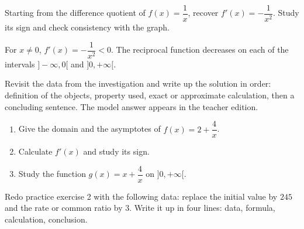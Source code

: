 \begin{activite}
Starting from the difference quotient of $f(x)=\dfrac1x$, recover $f'(x)=-\dfrac1{x^2}$. Study its sign and check consistency with the graph.

\end{activite}

\begin{traceecrite}For $x\neq0$, $f'(x)=-\dfrac1{x^2}<0$. The reciprocal function decreases on each of the intervals $]-\infty,0[$ and $]0,+\infty[$.\end{traceecrite}

\begin{exemple}
Revisit the data from the investigation and write up the solution in order: definition of the objects, property used, exact or approximate calculation, then a concluding sentence. The model answer appears in the teacher edition.
\end{exemple}

\begin{exercice}[-- essential]
\begin{enumerate}\item Give the domain and the asymptotes of $f(x)=2+\dfrac{4}x$.\item Calculate $f'(x)$ and study its sign.\item Study the function $g(x)=x+\dfrac{4}x$ on $]0,+\infty[$.\end{enumerate}
\end{exercice}


\begin{dm}Redo practice exercise 2 with the following data: replace the initial value by $245$ and the rate or common ratio by $3$. Write it up in four lines: data, formula, calculation, conclusion.\end{dm}

